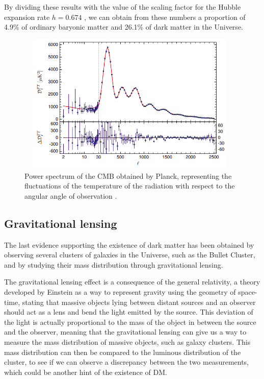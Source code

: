 \documentclass[a4paper, 10pt, openright]{report}
\begin{document}
By dividing these results with the value of the scaling factor for the Hubble expansion rate $h = 0.674$ \cite{Constants}, we can obtain from these numbers a proportion of 4.9\% of ordinary baryonic matter and 26.1\% of dark matter in the Universe.

\begin{figure}[htbp]
\begin{center}
\includegraphics[width=11cm, height=6.7cm]{figs/PlanckSpectrum.png}
\caption{Power spectrum of the \ac{CMB} obtained by Planck, representing the fluctuations of the temperature of the radiation with respect to the angular angle of observation \cite{Planck}.}
\label{figure:CMBSpectrum}
\end{center}
\end{figure}

\subsection{Gravitational lensing}

The last evidence supporting the existence of dark matter has been obtained by observing several clusters of galaxies in the Universe, such as the Bullet Cluster, and by studying their mass distribution through gravitational lensing.

The gravitational lensing effect is a consequence of the general relativity, a theory developed by Einstein as a way to represent gravity using the geometry of space-time, stating that massive objects lying between distant sources and an observer should act as a lens and bend the light emitted by the source. This deviation of the light is actually proportional to the mass of the object in between the source and the observer, meaning that the gravitational lensing can give us a way to measure the mass distribution of massive objects, such as galaxy clusters. This mass distribution can then be compared to the luminous distribution of the cluster, to see if we can observe a discrepancy between the two measurements, which could be another hint of the existence of \ac{DM}.
\end{document}
